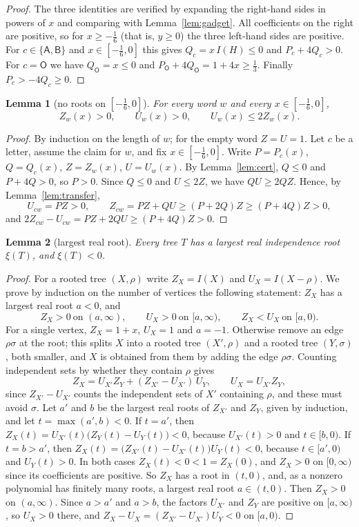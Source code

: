 \documentclass[11pt]{article}
\newtheorem{lemma}{Lemma}
\theoremstyle{definition}
\theoremstyle{remark}
\newcommand{\sA}{\mathsf A}
\newcommand{\sB}{\mathsf B}
\newcommand{\sO}{\mathsf O}
\begin{document}
\begin{proof}
The three identities are verified by expanding the right-hand sides in powers
of $x$ and comparing with Lemma~\ref{lem:gadget}. All coefficients on the
right are positive, so for $x\ge-\frac16$ (that is, $y\ge0$) the three
left-hand sides are positive. For $c\in\{\sA,\sB\}$ and $x\in[-\frac16,0]$
this gives $Q_c=x\,I(H)\le0$ and $P_c+4Q_c>0$. For $c=\sO$ we have $Q_\sO=x\le0$
and $P_\sO+4Q_\sO=1+4x\ge\frac13$. Finally $P_c>-4Q_c\ge0$.
\end{proof}

\begin{lemma}[{no roots on $[-\frac16,0]$}]\label{lem:pos}
For every word $w$ and every $x\in[-\frac16,0]$,
\[
Z_w(x)>0,\qquad U_w(x)>0,\qquad U_w(x)\le 2Z_w(x).
\]
\end{lemma}

\begin{proof}
By induction on the length of $w$; for the empty word $Z=U=1$. Let $c$ be a
letter, assume the claim for $w$, and fix $x\in[-\frac16,0]$. Write $P=P_c(x)$,
$Q=Q_c(x)$, $Z=Z_w(x)$, $U=U_w(x)$. By Lemma~\ref{lem:cert}, $Q\le0$ and
$P+4Q>0$, so $P>0$. Since $Q\le 0$ and $U\le 2Z$, we have $QU\ge 2QZ$. Hence,
by Lemma~\ref{lem:transfer},
\[
U_{cw}=PZ>0,\qquad
Z_{cw}=PZ+QU\ge (P+2Q)Z\ge (P+4Q)Z>0,
\]
and
$2Z_{cw}-U_{cw}=PZ+2QU\ge (P+4Q)Z>0$.
\end{proof}

\begin{lemma}[largest real root]\label{lem:root}
Every tree $T$ has a largest real independence root $\xi(T)$, and
$\xi(T)<0$.
\end{lemma}

\begin{proof}
For a rooted tree $(X,\rho)$ write $Z_X=I(X)$ and $U_X=I(X-\rho)$. We prove by
induction on the number of vertices the following statement: $Z_X$ has a
largest real root $a<0$, and
\[
Z_X>0\ \text{on }(a,\infty),\qquad U_X>0\ \text{on }[a,\infty),\qquad
Z_X<U_X\ \text{on }[a,0).
\]
For a single vertex, $Z_X=1+x$, $U_X=1$ and $a=-1$. Otherwise remove an edge
$\rho\sigma$ at the root; this splits $X$ into a rooted tree $(X',\rho)$ and a
rooted tree $(Y,\sigma)$, both smaller, and $X$ is obtained from them by
adding the edge $\rho\sigma$. Counting independent sets by whether they
contain $\rho$ gives
\[
Z_X=U_{X'}Z_Y+(Z_{X'}-U_{X'})\,U_Y,\qquad U_X=U_{X'}Z_Y,
\]
since $Z_{X'}-U_{X'}$ counts the independent sets of $X'$ containing $\rho$,
and these must avoid $\sigma$. Let $a'$ and $b$ be the largest real roots of
$Z_{X'}$ and $Z_Y$, given by induction, and let $t=\max(a',b)<0$. If $t=a'$,
then $Z_X(t)=U_{X'}(t)\bigl(Z_Y(t)-U_Y(t)\bigr)<0$, because $U_{X'}(t)>0$ and
$t\in[b,0)$. If $t=b>a'$, then $Z_X(t)=\bigl(Z_{X'}(t)-U_{X'}(t)\bigr)U_Y(t)<0$,
because $t\in[a',0)$ and $U_Y(t)>0$. In both cases $Z_X(t)<0<1=Z_X(0)$, and
$Z_X>0$ on $[0,\infty)$ since its coefficients are positive. So $Z_X$ has a
root in $(t,0)$, and, as a nonzero polynomial has finitely many roots, a
largest real root $a\in(t,0)$. Then $Z_X>0$ on $(a,\infty)$. Since $a>a'$ and
$a>b$, the factors $U_{X'}$ and $Z_Y$ are positive on $[a,\infty)$, so $U_X>0$
there, and $Z_X-U_X=(Z_{X'}-U_{X'})U_Y<0$ on $[a,0)$.
\end{proof}
\end{document}
